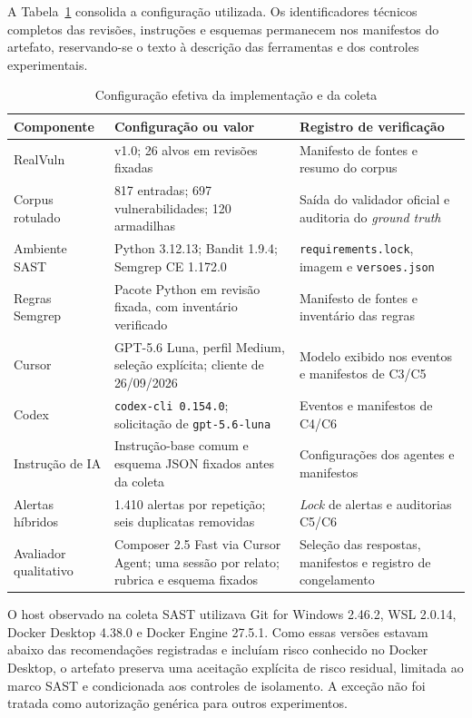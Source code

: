 A Tabela~\ref{tab:registro-configuracao-efetiva} consolida a configuração utilizada. Os identificadores técnicos completos das revisões, instruções e esquemas permanecem nos manifestos do artefato, reservando-se o texto à descrição das ferramentas e dos controles experimentais.

\begin{table}[htb]
\ABNTEXfontereduzida
\caption{Configuração efetiva da implementação e da coleta}
\label{tab:registro-configuracao-efetiva}
\centering
\begin{tabularx}{\textwidth}{|X|X|X|}
\hline
\textbf{Componente} & \textbf{Configuração ou valor} & \textbf{Registro de verificação} \\
\hline
RealVuln & v1.0; 26 alvos em revisões fixadas & Manifesto de fontes e resumo do corpus \\
\hline
Corpus rotulado & 817 entradas; 697 vulnerabilidades; 120 armadilhas & Saída do validador oficial e auditoria do \textit{ground truth} \\
\hline
Ambiente SAST & Python 3.12.13; Bandit 1.9.4; Semgrep CE 1.172.0 & \texttt{requirements.lock}, imagem e \texttt{versoes.json} \\
\hline
Regras Semgrep & Pacote Python em revisão fixada, com inventário verificado & Manifesto de fontes e inventário das regras \\
\hline
Cursor & GPT-5.6 Luna, perfil Medium, seleção explícita; cliente de 26/09/2026 & Modelo exibido nos eventos e manifestos de C3/C5 \\
\hline
Codex & \texttt{codex-cli 0.154.0}; solicitação de \texttt{gpt-5.6-luna} & Eventos e manifestos de C4/C6 \\
\hline
Instrução de IA & Instrução-base comum e esquema JSON fixados antes da coleta & Configurações dos agentes e manifestos \\
\hline
Alertas híbridos & 1.410 alertas por repetição; seis duplicatas removidas & \textit{Lock} de alertas e auditorias C5/C6 \\
\hline
Avaliador qualitativo & Composer 2.5 Fast via Cursor Agent; uma sessão por relato; rubrica e esquema fixados & Seleção das respostas, manifestos e registro de congelamento \\
\hline
\end{tabularx}
\end{table}

O host observado na coleta SAST utilizava Git for Windows 2.46.2, WSL 2.0.14, Docker Desktop 4.38.0 e Docker Engine 27.5.1. Como essas versões estavam abaixo das recomendações registradas e incluíam risco conhecido no Docker Desktop, o artefato preserva uma aceitação explícita de risco residual, limitada ao marco SAST e condicionada aos controles de isolamento. A exceção não foi tratada como autorização genérica para outros experimentos.

